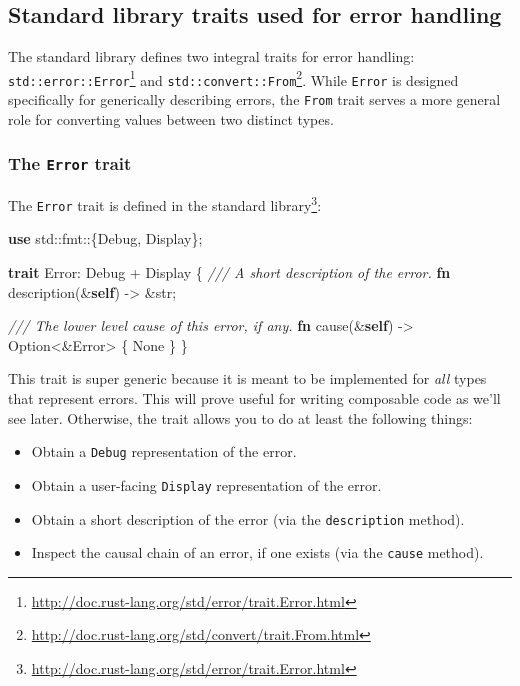 \documentclass[a4paper,]{book}
\renewcommand*{\hypertarget}[3][\ar]{%
  \def\ar{#2}%
  \label{#1}%
  #3}
\newenvironment{Shaded}{\begin{snugshade}}{\end{snugshade}}
\newcommand{\KeywordTok}[1]{\textcolor[rgb]{0.13,0.29,0.53}{\textbf{{#1}}}}
\newcommand{\DataTypeTok}[1]{\textcolor[rgb]{0.13,0.29,0.53}{{#1}}}
\newcommand{\ConstantTok}[1]{\textcolor[rgb]{0.00,0.00,0.00}{{#1}}}
\newcommand{\CommentTok}[1]{\textcolor[rgb]{0.56,0.35,0.01}{\textit{{#1}}}}
\newcommand{\BuiltInTok}[1]{{#1}}
\newcommand{\NormalTok}[1]{{#1}}
\renewcommand{\href}[2]{#2\footnote{\url{#1}}}
\providecommand{\tightlist}{%
  \setlength{\itemsep}{0pt}\setlength{\parskip}{0pt}}
\begin{document}
\hypertarget{standard-library-traits-used-for-error-handling}{\subsection{Standard
library traits used for error
handling}\label{standard-library-traits-used-for-error-handling}}

The standard library defines two integral traits for error handling:
\href{http://doc.rust-lang.org/std/error/trait.Error.html}{\texttt{std::error::Error}}
and
\href{http://doc.rust-lang.org/std/convert/trait.From.html}{\texttt{std::convert::From}}.
While \texttt{Error} is designed specifically for generically describing
errors, the \texttt{From} trait serves a more general role for
converting values between two distinct types.

\hypertarget{the-error-trait}{\subsubsection{\texorpdfstring{The
\texttt{Error} trait}{The Error trait}}\label{the-error-trait}}

The \texttt{Error} trait is
\href{http://doc.rust-lang.org/std/error/trait.Error.html}{defined in
the standard library}:

\begin{Shaded}
\begin{Highlighting}[]
\KeywordTok{use} \NormalTok{std::fmt::\{}\BuiltInTok{Debug}\NormalTok{, }\BuiltInTok{Display}\NormalTok{\};}

\KeywordTok{trait} \NormalTok{Error: }\BuiltInTok{Debug} \NormalTok{+ }\BuiltInTok{Display} \NormalTok{\{}
  \CommentTok{/// A short description of the error.}
  \KeywordTok{fn} \NormalTok{description(&}\KeywordTok{self}\NormalTok{) -> &}\DataTypeTok{str}\NormalTok{;}

  \CommentTok{/// The lower level cause of this error, if any.}
  \KeywordTok{fn} \NormalTok{cause(&}\KeywordTok{self}\NormalTok{) -> }\DataTypeTok{Option}\NormalTok{<&Error> \{ }\ConstantTok{None} \NormalTok{\}}
\NormalTok{\}}
\end{Highlighting}
\end{Shaded}

This trait is super generic because it is meant to be implemented for
\emph{all} types that represent errors. This will prove useful for
writing composable code as we'll see later. Otherwise, the trait allows
you to do at least the following things:

\begin{itemize}
\tightlist
\item
  Obtain a \texttt{Debug} representation of the error.
\item
  Obtain a user-facing \texttt{Display} representation of the error.
\item
  Obtain a short description of the error (via the \texttt{description}
  method).
\item
  Inspect the causal chain of an error, if one exists (via the
  \texttt{cause} method).
\end{itemize}
\end{document}
